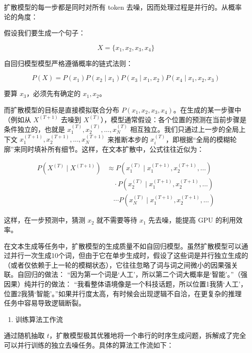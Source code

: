 扩散模型的每一步都是同时对所有 token 去噪，因而处理过程是并行的。从概率论的角度：

假设我们要生成一个句子：

\[
X = \{x_1, x_2, x_3, x_4\}
\]

自回归模型模型严格遵循概率的链式法则：

\[
P(X) = P(x_1)P(x_2 \mid x_1)P(x_3 \mid x_1, x_2)P(x_4 \mid x_1, x_2, x_3)
\]

要算 \(x_3\)，必须先有确定的 \(x_1,x_2\)。

而扩散模型的目标是直接模拟联合分布 \(P(x_1,x_2,x_3,x_4)\)。在生成的某一步骤中（例如从 \(X^{(T+1)}\) 去噪到 \(X^{(T)}\)），模型通常假设：各个位置的预测在当前步骤是条件独立的，也就是 \(x_1^{(T)},x_2^{(T)},\ldots,x_N^{(T)}\) 相互独立。我们只通过上一步的全局上下文 \(x_1^{(T+1)},x_2^{(T+1)},\ldots,x_N^{(T+1)}\) 来推断本步的 \(x_i^{(T)}\)，即根据``全局的模糊轮廓''来同时填补所有细节。这样，在文本扩散中，公式往往近似为：

\[
\begin{aligned}
P(X^{(T)} \mid X^{(T+1)})
&\approx
P(x_1^{(T)} \mid x_1^{(T+1)},x_2^{(T+1)},\ldots) \\
&\quad \cdot P(x_2^{(T)} \mid x_1^{(T+1)},x_2^{(T+1)},\ldots) \\
&\quad \cdots
P(x_N^{(T)} \mid x_1^{(T+1)},x_2^{(T+1)},\ldots)
\end{aligned}
\]

这样，在一步预测中，猜测 \(x_2\) 就不需要等待 \(x_1\) 先去噪，能提高 GPU 的利用效率。

在文本生成等任务中，扩散模型的生成质量不如自回归模型。虽然扩散模型可以通过并行一次生成10个词，但由于它在单步生成时，假设了这些词是并行独立生成的（或者仅依赖于上一轮的模糊状态），它往往忽略了词与词之间微小的因果强关联。自回归的做法： ``因为第一个词是`人工'，所以第二个词大概率是`智能'。''（强因果）纯并行的做法： ``我看整体语境像是一个科技话题，所以位置1我猜`人工'，位置2我猜`智能'。''如果并行度太高，有时候会出现逻辑不自洽，在更复杂的推理任务中容易导致逻辑断裂。

\begin{enumerate}
\def\labelenumi{\arabic{enumi}.}
\setcounter{enumi}{2}
\tightlist
\item
  训练算法工作流
\end{enumerate}

通过随机抽取 \(t\)，扩散模型极其优雅地将一个串行的时序生成问题，拆解成了完全可以并行训练的独立去噪任务。具体的算法工作流如下：


